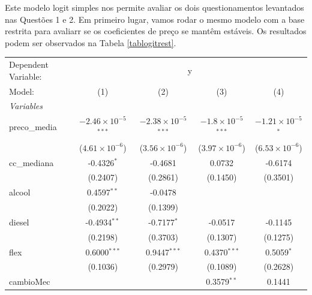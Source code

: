 \documentclass{article}
\begin{document}
Este modelo logit simples nos permite avaliar os dois questionamentos levantados nas Questões 1 e 2. Em primeiro lugar, vamos rodar o mesmo modelo com a base restrita para avaliarr se os coeficientes de preço se mantêm estáveis. Os resultados podem ser observados na Tabela \ref{tablogitrest}.

\begin{table}[H]
\begingroup
\centering
\begin{tabular}{lcccc}
   \tabularnewline \midrule \midrule
   Dependent Variable: & \multicolumn{4}{c}{y}\\
   Model:        & (1)                            & (2)                            & (3)                           & (4)\\  
   \midrule
   \emph{Variables}\\
   preco\_media  & $-2.46\times 10^{-5}$$^{***}$  & $-2.38\times 10^{-5}$$^{***}$  & $-1.8\times 10^{-5}$$^{***}$  & $-1.21\times 10^{-5}$$^{*}$\\    
                 & ($4.61\times 10^{-6}$)         & ($3.56\times 10^{-6}$)         & ($3.97\times 10^{-6}$)        & ($6.53\times 10^{-6}$)\\    
   cc\_mediana   & -0.4326$^{*}$                  & -0.4681                        & 0.0732                        & -0.6174\\   
                 & (0.2407)                       & (0.2861)                       & (0.1450)                      & (0.3501)\\   
   alcool        & 0.4597$^{**}$                  & -0.0478                        &                               &   \\   
                 & (0.2022)                       & (0.1399)                       &                               &   \\   
   diesel        & -0.4934$^{**}$                 & -0.7177$^{*}$                  & -0.0517                       & -0.1145\\   
                 & (0.2198)                       & (0.3703)                       & (0.1307)                      & (0.1275)\\   
   flex          & 0.6000$^{***}$                 & 0.9447$^{***}$                 & 0.4370$^{***}$                & 0.5059$^{*}$\\   
                 & (0.1036)                       & (0.2979)                       & (0.1089)                      & (0.2628)\\   
   cambioMec     &                                &                                & 0.3579$^{**}$                 & 0.1441\\   

\end{tabular}
\end{table}
\end{document}
